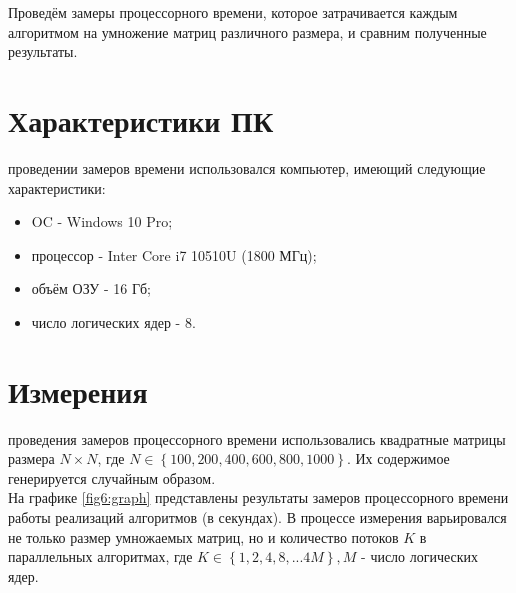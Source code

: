 Проведём замеры процессорного времени, которое затрачивается каждым алгоритмом на умножение матриц различного размера, и сравним полученные результаты.

\section{Характеристики ПК}
 проведении замеров времени использовался компьютер, имеющий следующие характеристики:
\begin{itemize}
	\item OC - Windows 10 Pro;
	\item процессор - Inter Core i7 10510U (1800 МГц);
	\item объём ОЗУ - 16 Гб;
	\item число логических ядер - 8.
\end{itemize}

\section{Измерения}
 проведения замеров процессорного времени использовались квадратные матрицы размера $N \times N$, где
$N \in \left\lbrace 100, 200, 400, 600, 800, 1000 \right\rbrace$.
Их содержимое генерируется случайным образом.\\

На графике \ref{fig6:graph} представлены результаты замеров процессорного времени работы реализаций алгоритмов (в секундах). В процессе измерения варьировался не только размер умножаемых матриц, но и количество потоков $K$ в параллельных алгоритмах, где $K \in \left\lbrace 1, 2, 4, 8, ... 4M \right\rbrace, M$ - число логических ядер.\\

